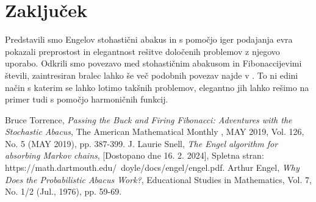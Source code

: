\documentclass[twoside,11pt]{article}
\begin{document}
\section{Zaključek}
Predstavili smo Engelov stohastični abakus in s pomočjo iger podajanja evra pokazali preprostost in elegantnost rešitve določenih problemov z njegovo uporabo. 
Odkrili smo povezavo med stohastičnim abakusom in Fibonaccijevimi števili, zaintresiran bralec lahko še več podobnih povezav najde v \cite{7}. To ni edini način s katerim se lahko lotimo takšnih problemov, elegantno jih lahko rešimo na primer tudi s pomočjo harmoničnih funkcij.


\begin{thebibliography}{99}

 Bruce Torrence, \emph{  Passing the Buck and Firing Fibonacci: Adventures with the Stochastic Abacus}, The American Mathematical Monthly , MAY 2019, Vol. 126, No. 5 (MAY 2019), pp. 387-399.
 J. Laurie Snell, \emph{The Engel algorithm for absorbing Markov chains}, [Dostopano dne 16. 2. 2024], Spletna stran: https://math.dartmouth.edu/~doyle/docs/engel/engel.pdf. 
 Arthur Engel, \emph{Why Does the Probabilistic Abacus Work?},  Educational Studies in Mathematics, Vol. 7, No. 1/2 (Jul., 1976), pp. 59-69. 

\end{thebibliography}
\end{document}
